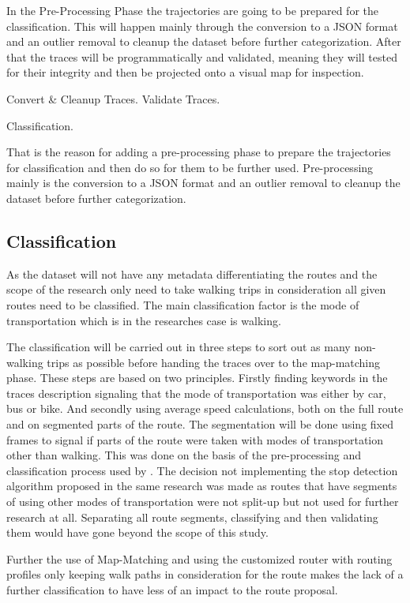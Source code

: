 In the Pre-Processing Phase the trajectories are going to be prepared for the classification. This will happen mainly through the conversion to a JSON format and an outlier removal to cleanup the dataset before further categorization. After that the traces will be programmatically and validated, meaning they will tested for their integrity and then be projected onto a visual map for inspection.

Convert & Cleanup Traces.
Validate Traces.

Classification.

That is the reason for adding a pre-processing phase to prepare the trajectories for classification and then do so for them to be further used. Pre-processing mainly is the conversion to a JSON format and an outlier removal to cleanup the dataset before further categorization. 


\subsection{Classification}

As the dataset will not have any metadata differentiating the routes and the scope of the research only need to take walking trips in consideration all given routes need to be classified. The main classification factor is the mode of transportation which is in the researches case is walking. 

The classification will be carried out in three steps to sort out as many non-walking trips as possible before handing the traces over to the map-matching phase. These steps are based on two principles. Firstly finding keywords in the traces description signaling that the mode of transportation was either by car, bus or bike. And secondly using average speed calculations, both on the full route and on segmented parts of the route. The segmentation will be done using fixed frames to signal if parts of the route were taken with modes of transportation other than walking. This was done on the basis of the pre-processing and classification process used by \autocite[]{Qiu2015}. The decision not implementing the stop detection algorithm proposed in the same research was made as routes that have segments of using other modes of transportation were not split-up but not used for further research at all. Separating all route segments, classifying and then validating them would have gone beyond the scope of this study.

Further the use of Map-Matching and using the customized router with routing profiles only keeping walk paths in consideration for the route makes the lack of a further classification to have less of an impact to the route proposal.

